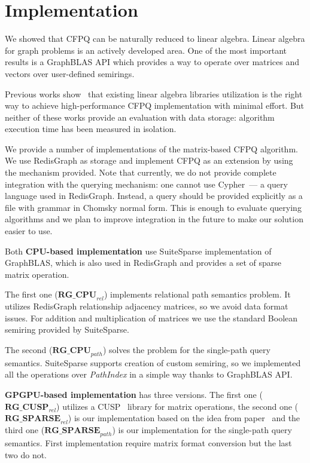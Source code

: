 \section{Implementation}

We showed that CFPQ can be naturally reduced to linear algebra.
Linear algebra for graph problems is an actively developed area.
One of the most important results is a GraphBLAS API which provides a way to operate over matrices and vectors over user-defined semirings.

Previous works show~\cite{Mishin:2019:ECP:3327964.3328503, Azimov:2018:CPQ:3210259.3210264} that existing linear algebra libraries utilization is the right way to achieve high-performance CFPQ implementation with minimal effort.
But neither of these works provide an evaluation with data storage: algorithm execution time has been measured in isolation.

We provide a number of implementations of the matrix-based CFPQ algorithm.
We use RedisGraph as storage and implement CFPQ as an extension by using the mechanism provided.
Note that currently, we do not provide complete integration with the querying mechanism: one cannot use Cypher~--- a query language used in RedisGraph.
Instead, a query should be provided explicitly as a file with grammar in Chomsky normal form.
This is enough to evaluate querying algorithms and we plan to improve integration in the future to make our solution easier to use. 

Both \textbf{CPU-based implementation} use SuiteSparse implementation of GraphBLAS, which is also used in RedisGraph and provides a set of sparse matrix operation.

The first one ($\textbf{RG\_CPU}_{rel}$) implements relational path semantics problem. It utilizes RedisGraph relationship adjacency matrices, so we avoid data format issues. For addition and multiplication of matrices we use the standard Boolean semiring provided by SuiteSparse.

The second ($\textbf{RG\_CPU}_{path}$) solves the problem for the single-path query semantics. SuiteSparse supports creation of custom semiring, so we implemented all the operations over \textit{PathIndex} in a simple way thanks to GraphBLAS API.

\textbf{GPGPU-based implementation} has three versions.
The first one ($\textbf{RG\_CUSP}_{rel}$) utilizes a CUSP~\cite{Cusp} library for matrix operations, the second one ($\textbf{RG\_SPARSE}_{rel}$) is our implementation based on the idea from paper~\cite{NsparsePaper} and the third one ($\textbf{RG\_SPARSE}_{path}$) is our implementation for the single-path query semantics.
First implementation require matrix format conversion but the last two do not.


